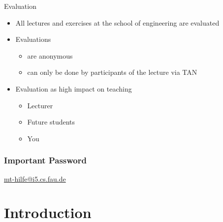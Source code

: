 \begin{frame}{Evaluation}
	\begin{itemize}
		\setlength\itemsep{0.3cm}
		\item All lectures and exercises at the school of engineering are evaluated
		\item Evaluations
		      \begin{itemize}
			      \item are anonymous
			      \item can only be done by participants of the lecture via TAN
		      \end{itemize}
		\item Evaluation as high impact on teaching
		      \begin{itemize}
			      \item Lecturer
			      \item Future students
			      \item You
		      \end{itemize}
	\end{itemize}
\end{frame}

\begin{frame}
	\frametitle{Important Password}

	\begin{center}
		\alert{\href{mailto:mt-hilfe@i5.cs.fau.de}{mt-hilfe@i5.cs.fau.de}}
	\end{center}
\end{frame}


\section{Introduction}

